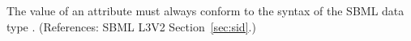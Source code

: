 The value of an  attribute must always conform to the syntax of
the SBML data type .  (References: SBML L3V2
Section~\ref{sec:sid}.)
